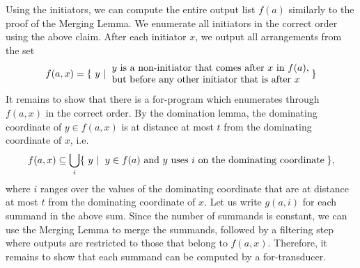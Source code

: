 Using the initiators, we can compute the entire output list $f(a)$ similarly to the proof of the Merging Lemma. We enumerate all initiators in the correct order using the above claim. After each initiator $x$, we output all arrangements from the set
\begin{align*}
f(a,x) = \setbuild{y}{$y$ is a non-initiator that comes after $x$ in $f(a)$, \\ but  before any other initiator that is after $x$ }
\end{align*}
It remains to show that there is a for-program which enumerates through   $f(a,x)$ in the correct order. 
By the domination lemma, the dominating coordinate of $y \in f(a,x)$ is at distance at most $t$ from the dominating coordinate of $x$, i.e.~
\begin{align*}
f(a,x) \subseteq \bigcup_i  \setbuild{y}{$y \in f(a)$ and $y$ uses $i$ on the dominating coordinate},
\end{align*}
where $i$ ranges over the values of the dominating coordinate that are at distance at most $t$ from the dominating coordinate of $x$.  Let us write $g(a,i)$ for each summand in the above sum. Since the number of summands is constant, we can use the Merging Lemma to merge the summands, followed by a filtering step where outputs are restricted to those that belong to $f(a,x)$. Therefore,  it remains to show that each summand can be computed by a for-transducer. 

